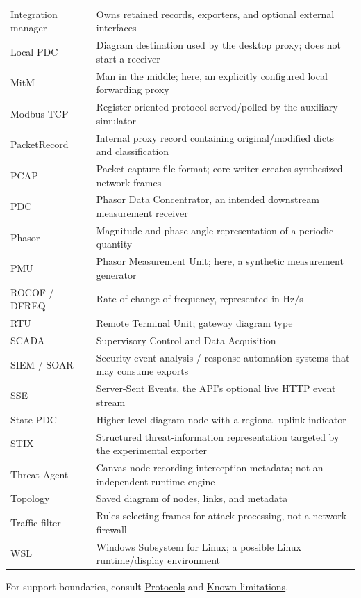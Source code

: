 \begin{longtable}{@{}>{\raggedright\arraybackslash}p{}>{\raggedright\arraybackslash}p{}@{}}
Integration manager & Owns retained records, exporters, and optional external interfaces \\
Local PDC & Diagram destination used by the desktop proxy; does not start a receiver \\
\rowcolor{pale}
MitM & Man in the middle; here, an explicitly configured local forwarding proxy \\
Modbus TCP & Register-oriented protocol served/polled by the auxiliary simulator \\
\rowcolor{pale}
PacketRecord & Internal proxy record containing original/modified dicts and classification \\
PCAP & Packet capture file format; core writer creates synthesized network frames \\
\rowcolor{pale}
PDC & Phasor Data Concentrator, an intended downstream measurement receiver \\
Phasor & Magnitude and phase angle representation of a periodic quantity \\
\rowcolor{pale}
PMU & Phasor Measurement Unit; here, a synthetic measurement generator \\
ROCOF / DFREQ & Rate of change of frequency, represented in Hz/s \\
\rowcolor{pale}
RTU & Remote Terminal Unit; gateway diagram type \\
SCADA & Supervisory Control and Data Acquisition \\
\rowcolor{pale}
SIEM / SOAR & Security event analysis / response automation systems that may consume exports \\
SSE & Server-Sent Events, the API's optional live HTTP event stream \\
\rowcolor{pale}
State PDC & Higher-level diagram node with a regional uplink indicator \\
STIX & Structured threat-information representation targeted by the experimental exporter \\
\rowcolor{pale}
Threat Agent & Canvas node recording interception metadata; not an independent runtime engine \\
Topology & Saved diagram of nodes, links, and metadata \\
\rowcolor{pale}
Traffic filter & Rules selecting frames for attack processing, not a network firewall \\
WSL & Windows Subsystem for Linux; a possible Linux runtime/display environment \\
\end{longtable}
\endgroup

For support boundaries, consult \hyperref[chapter-7]{Protocols} and \hyperref[chapter-16]{Known limitations}.

